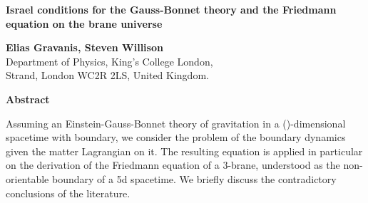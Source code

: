 \documentclass[a4paper,a4paper]{article}
\begin{document}
\begin{centering}

\vspace{0in}

{\Large {\bf Israel conditions for the Gauss-Bonnet theory and the Friedmann equation on 
the brane universe}}



\vspace{0.4in}



{ \bf Elias Gravanis, \; Steven Willison} \\
\vspace{0.2in}
Department of Physics, King's College London,\\
Strand, London WC2R 2LS, United Kingdom.



\vspace{0.2in}
 {\bf Abstract}

\end{centering}

\vspace{0.2in}

{\small Assuming an Einstein-Gauss-Bonnet theory of gravitation in a (\coordHE{})-dimensional spacetime
with boundary, we consider the problem of the boundary dynamics given the matter Lagrangian on it. The
resulting equation is applied in particular on the derivation of the Friedmann equation of a 3-brane, 
understood as the non-orientable boundary of a 5d spacetime. We briefly discuss the contradictory 
conclusions of the literature.}


\vspace{0.3in}
\end{document}
